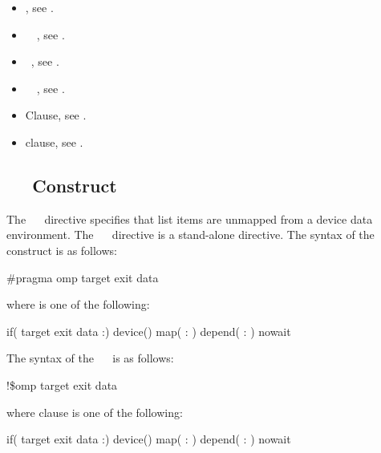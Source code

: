 {\begin{itemize}
\item {}, see .

\item {}~~, 
      see . 

\item {}~, see .

\item {}~~, 
      see .

\item {} Clause, see .

\item {} clause, see .
\end{itemize}





\subsection{~~ Construct}
\label{subsec:target exit data Construct}
\summary
The ~~ directive specifies that list items are unmapped from a device data environment. The ~~ directive is a stand-alone directive.
\syntax
\ccppspecificstart
The syntax of the ~~ construct is as follows:
\begin{boxedcode}
\#pragma omp target exit data 
\end{boxedcode}
where  is one of the following:
\begin{indentedcodelist}
if(\plc{[} target exit data :\plc{] scalar-expression})
device()
map(\plc{[ [map-type-modifier[,]] map-type} : \plc{] list})
depend( : )
nowait
\end{indentedcodelist}
\ccppspecificend
\fortranspecificstart
The syntax of the ~~ is as follows:
\begin{boxedcode}
!\$omp target exit data 
\end{boxedcode}
where clause is one of the following:
\begin{indentedcodelist}
if(\plc{[} target exit data :\plc{] scalar-logical-expression})
device()
map(\plc{[ [map-type-modifier[,]] map-type} : \plc{] list})
depend( : )
nowait
\end{indentedcodelist}
\fortranspecificend

}
